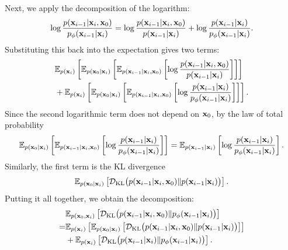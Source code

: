 Next, we apply the decomposition of the logarithm:
\begin{align*}
    \log \frac{p({\mathbf{x}}_{i-1}|{\mathbf{x}}_i, {\mathbf{x}}_0)}{p_\phi({\mathbf{x}}_{i-1}|{\mathbf{x}}_i)}
    =\log \frac{p({\mathbf{x}}_{i-1}|{\mathbf{x}}_i, {\mathbf{x}}_0)}{p({\mathbf{x}}_{i-1}|{\mathbf{x}}_i)} 
    + \log \frac{p({\mathbf{x}}_{i-1}|{\mathbf{x}}_i)}{p_\phi({\mathbf{x}}_{i-1}|{\mathbf{x}}_i)}.
\end{align*}
Substituting this back into the expectation gives two terms:
\begin{align*}
    &\mathbb{E}_{p({\mathbf{x}}_i)} \left[
    \mathbb{E}_{p({\mathbf{x}}_0|{\mathbf{x}}_i)} \left[
    \mathbb{E}_{p({\mathbf{x}}_{i-1}|{\mathbf{x}}_i, {\mathbf{x}}_0)} \left[
    \log \frac{p({\mathbf{x}}_{i-1}|{\mathbf{x}}_i, {\mathbf{x}}_0)}{p({\mathbf{x}}_{i-1}|{\mathbf{x}}_i)}
    \right]
    \right]
    \right]
    \\
    &+
    \mathbb{E}_{p({\mathbf{x}}_i)} \left[
    \mathbb{E}_{p({\mathbf{x}}_0|{\mathbf{x}}_i)} \left[
    \mathbb{E}_{p({\mathbf{x}}_{i-1}|{\mathbf{x}}_i, {\mathbf{x}}_0)} \left[
    \log \frac{p({\mathbf{x}}_{i-1}|{\mathbf{x}}_i)}{p_\phi({\mathbf{x}}_{i-1}|{\mathbf{x}}_i)}
    \right]
    \right]
    \right].
\end{align*}
Since the second logarithmic term does not depend on ${\mathbf{x}}_0$, by the law of total probability
\begin{align*}
    \mathbb{E}_{p({\mathbf{x}}_0|{\mathbf{x}}_i)} \left[
    \mathbb{E}_{p({\mathbf{x}}_{i-1}|{\mathbf{x}}_i, {\mathbf{x}}_0)} \left[
    \log \frac{p({\mathbf{x}}_{i-1}|{\mathbf{x}}_i)}{p_\phi({\mathbf{x}}_{i-1}|{\mathbf{x}}_i)}
    \right]
    \right]
    = \mathbb{E}_{p({\mathbf{x}}_{i-1}|{\mathbf{x}}_i)} \left[
    \log \frac{p({\mathbf{x}}_{i-1}|{\mathbf{x}}_i)}{p_\phi({\mathbf{x}}_{i-1}|{\mathbf{x}}_i)}
    \right].
\end{align*}
Similarly, the first term is the KL divergence
\begin{align*}
    \mathbb{E}_{p({\mathbf{x}}_0|{\mathbf{x}}_i)} \left[
    \mathcal{D}_{\text{KL}} \big(p({\mathbf{x}}_{i-1}|{\mathbf{x}}_i, {\mathbf{x}}_0)  \|  p({\mathbf{x}}_{i-1}|{\mathbf{x}}_i)\big)
    \right].
\end{align*}
Putting it all together, we obtain the decomposition:
\begin{align*}
    &\mathbb{E}_{p({\mathbf{x}}_0, {\mathbf{x}}_i)} \left[
    \mathcal{D}_{\text{KL}} \big(p({\mathbf{x}}_{i-1}|{\mathbf{x}}_i, {\mathbf{x}}_0)  \|  p_\phi({\mathbf{x}}_{i-1}|{\mathbf{x}}_i)\big)
    \right]
    \\
    =& \mathbb{E}_{p({\mathbf{x}}_i)} \left[
    \mathbb{E}_{p({\mathbf{x}}_0|{\mathbf{x}}_i)} \left[
    \mathcal{D}_{\text{KL}} \big(p({\mathbf{x}}_{i-1}|{\mathbf{x}}_i, {\mathbf{x}}_0)  \|  p({\mathbf{x}}_{i-1}|{\mathbf{x}}_i)\big)
    \right]
    \right]
    \\
    &+
    \mathbb{E}_{p({\mathbf{x}}_i)} \left[
    \mathcal{D}_{\text{KL}} \big(p({\mathbf{x}}_{i-1}|{\mathbf{x}}_i)  \|  p_\phi({\mathbf{x}}_{i-1}|{\mathbf{x}}_i)\big)
    \right].
\end{align*}

